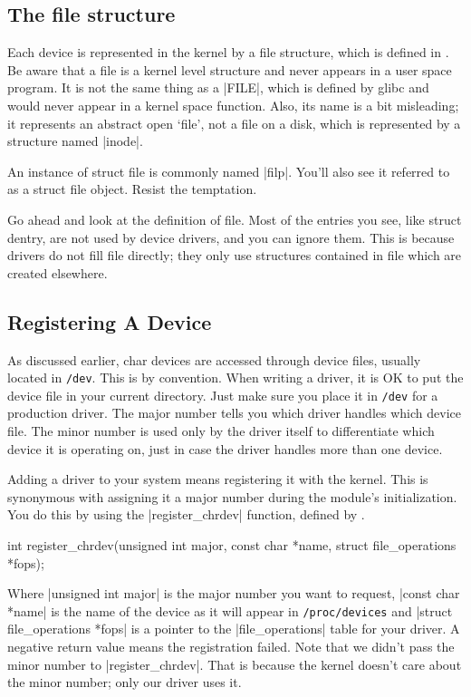 \documentclass[10pt, oneside]{book}
\begin{document}
\subsection{The file structure}
\label{sec:file_struct}

Each device is represented in the kernel by a file structure, which is defined in .
Be aware that a file is a kernel level structure and never appears in a user space program.
It is not the same thing as a \cpp|FILE|, which is defined by glibc and would never appear in a kernel space function.
Also, its name is a bit misleading; it represents an abstract open `file', not a file on a disk, which is represented by a structure named \cpp|inode|.

An instance of struct file is commonly named \cpp|filp|.
You'll also see it referred to as a struct file object.
Resist the temptation.

Go ahead and look at the definition of file.
Most of the entries you see, like struct dentry, are not used by device drivers, and you can ignore them.
This is because drivers do not fill file directly; they only use structures contained in file which are created elsewhere.

\subsection{Registering A Device}
\label{sec:register_device}
As discussed earlier, char devices are accessed through device files, usually located in \verb|/dev|.
This is by convention. When writing a driver, it is OK to put the device file in your current directory.
Just make sure you place it in \verb|/dev| for a production driver.
The major number tells you which driver handles which device file.
The minor number is used only by the driver itself to differentiate which device it is operating on, just in case the driver handles more than one device.

Adding a driver to your system means registering it with the kernel.
This is synonymous with assigning it a major number during the module's initialization.
You do this by using the \cpp|register_chrdev| function, defined by .

\begin{code}
int register_chrdev(unsigned int major, const char *name, struct file_operations *fops);
\end{code}

Where \cpp|unsigned int major| is the major number you want to request, \cpp|const char *name| is the name of the device as it will appear in \verb|/proc/devices| and \cpp|struct file_operations *fops| is a pointer to the \cpp|file_operations| table for your driver.
A negative return value means the registration failed. Note that we didn't pass the minor number to \cpp|register_chrdev|.
That is because the kernel doesn't care about the minor number; only our driver uses it.
\end{document}
